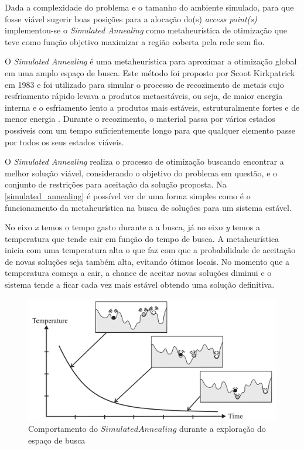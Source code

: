 \documentclass[
	12pt,				%
	twoside,			%
	a4paper,			%
	english,			%
	french,				%
	spanish,			%
	brazil				%
	]{abntex2}
\begin{document}
Dada a complexidade do problema e o tamanho do ambiente simulado, para
que fosse viável sugerir boas posições para a alocação do(s)
\emph{access point(s)} implementou-se o \emph{Simulated Annealing} como
metaheurística de otimização que teve como função objetivo maximizar a
região coberta pela rede sem fio.

O \emph{Simulated Annealing} é uma metaheurística para aproximar a
otimização global em uma amplo espaço de busca. Este método foi proposto
por Scoot Kirkpatrick em 1983 e foi utilizado para simular o processo de
recozimento de metais cujo resfriamento rápido levava a produtos
metaestáveis, ou seja, de maior energia interna e o esfriamento lento a
produtos mais estáveis, estruturalmente fortes e de menor energia
\cite{VAN}. Durante o recozimento, o material passa por vários estados
possíveis com um tempo suficientemente longo para que qualquer elemento
passe por todos os seus estados viáveis.

O \emph{Simulated Annealing} realiza o processo de otimização buscando
encontrar a melhor solução viável, considerando o objetivo do problema
em questão, e o conjunto de restrições para aceitação da solução
proposta. Na \autoref{simulated_annealing} é possível ver de uma forma
simples como é o funcionamento da metaheurística na busca de soluções
para um sistema estável.

No eixo \emph{x} temos o tempo gasto durante a a busca, já no eixo
\emph{y} temos a temperatura que tende cair em função do tempo de busca.
A metaheurística inicia com uma temperatura alta o que faz com que a
probabilidade de aceitação de novas soluções seja também alta, evitando
ótimos locais. No momento que a temperatura começa a cair, a chance de
aceitar novas soluções diminui e o sistema tende a ficar cada vez mais
estável obtendo uma solução definitiva.

\begin{figure}[htb]
    \caption{\label{simulated_annealing} Comportamento do $Simulated Annealing$ durante a exploração do espaço de busca}
    \begin{center}
        \includegraphics[scale=0.185]{imagens/simulated-annealing.png}
    \end{center}
\end{figure}
\end{document}
